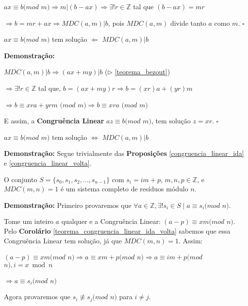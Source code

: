 $ax\equiv b(mod$ $m) \Rightarrow m|(b-ax) \Rightarrow \exists! r\in\mathbb{Z}$ tal que $(b-ax) = mr$

$\Rightarrow b = mr + ax \Rightarrow MDC(a,m)|b$, pois $MDC(a,m)$ divide tanto $a$ como $m$. $\square$



\begin{proposition}\label{congruencia_linear_volta}
$ax \equiv b (mod$ $m)$ tem solução $\Leftarrow$ $MDC(a,m)|b$
\end{proposition}
\textbf{Demonstração:}

$MDC(a,m)|b \Rightarrow (ax+my)|b$ ($\triangleright$ \autoref{teorema_bezout})

$\Rightarrow \exists!r\in\mathbb{Z}$ tal que, $b=(ax + my)r \Rightarrow b = (xr)a + (yr)m$

$\Rightarrow b \equiv xra + yrm$ $(mod$ $m) \Rightarrow b \equiv xra$ $(mod$ $m)$

E assim, a \textbf{Congruência Linear} $az\equiv b (mod$ $m)$, tem solução $z=xr$. $\square$

\begin{corollary}\label{teorema_congruencia_linear_ida_volta}
$ax \equiv b (mod$ $m)$ tem solução $\Leftrightarrow$ $MDC(a,m)|b$
\end{corollary}
\textbf{Demonstração:}
Segue trivialmente das \textbf{Proposições} \autoref{congruencia_linear_ida} e \autoref{congruencia_linear_volta}.




\begin{theorem}\label{sistemo_completp_residuo}
O conjunto $S = \{s_0, s_1, s_2,..., s_{n-1}\}$ com $s_i = im + p$, $m, n, p \in \mathbb{Z}$, e $MDC(m,n) = 1$ é um sistema completo de resíduos módulo $n$.
\end{theorem}
\textbf{Demonstração:}
Primeiro provaremos que $\forall a \in \mathbb{Z}, \exists! s_i \in S \mid a \equiv s_i (mod$ $n)$.

Tome um inteiro $a$ qualquer e a Congruência Linear: $(a-p)\equiv xm(mod$ $n)$. Pelo \textbf{Corolário} \autoref{teorema_congruencia_linear_ida_volta} sabemos que essa Congruência Linear tem solução, já que $MDC(m,n)=1$. Assim:

$(a-p)\equiv xm(mod$ $n) \Rightarrow a\equiv xm+p(mod$ $n) \Rightarrow a\equiv im + p (mod$ $n), i=x\bmod n$

$\Rightarrow a\equiv s_i(mod$ $n)$

Agora provaremos que $s_i \not\equiv s_j (mod $ $n)$ para $i \neq j$.


